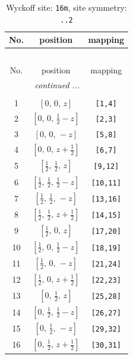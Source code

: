 \documentclass[fleqn,8pt]{jsarticle}
\begin{document}
\renewcommand{\arraystretch}{1.2}
\begin{longtable}{ccc}
\caption{Wyckoff site: {\tt 16m}, site symmetry: {\tt ..2}}
 \\
 \hline \hline
No. & position & mapping \\ \hline \endfirsthead

\multicolumn{2}{l}{\tablename\ \thetable{}} \\
 \hline \hline
No. & position & mapping \\ \hline \endhead

 \hline \hline
\multicolumn{2}{r}{\footnotesize\it continued ...} \\ \endfoot

 \hline \hline
\multicolumn{2}{r}{} \\ \endlastfoot

1 & $\left[ 0,\, 0,\, z \right]$ & {\tt [1,4]} \\ \hline
2 & $\left[ 0,\, 0,\, \frac{1}{2} - z \right]$ & {\tt [2,3]} \\ \hline
3 & $\left[ 0,\, 0,\, - z \right]$ & {\tt [5,8]} \\ \hline
4 & $\left[ 0,\, 0,\, z + \frac{1}{2} \right]$ & {\tt [6,7]} \\ \hline
5 & $\left[ \frac{1}{2},\, \frac{1}{2},\, z \right]$ & {\tt [9,12]} \\ \hline
6 & $\left[ \frac{1}{2},\, \frac{1}{2},\, \frac{1}{2} - z \right]$ & {\tt [10,11]} \\ \hline
7 & $\left[ \frac{1}{2},\, \frac{1}{2},\, - z \right]$ & {\tt [13,16]} \\ \hline
8 & $\left[ \frac{1}{2},\, \frac{1}{2},\, z + \frac{1}{2} \right]$ & {\tt [14,15]} \\ \hline
9 & $\left[ \frac{1}{2},\, 0,\, z \right]$ & {\tt [17,20]} \\ \hline
10 & $\left[ \frac{1}{2},\, 0,\, \frac{1}{2} - z \right]$ & {\tt [18,19]} \\ \hline
11 & $\left[ \frac{1}{2},\, 0,\, - z \right]$ & {\tt [21,24]} \\ \hline
12 & $\left[ \frac{1}{2},\, 0,\, z + \frac{1}{2} \right]$ & {\tt [22,23]} \\ \hline
13 & $\left[ 0,\, \frac{1}{2},\, z \right]$ & {\tt [25,28]} \\ \hline
14 & $\left[ 0,\, \frac{1}{2},\, \frac{1}{2} - z \right]$ & {\tt [26,27]} \\ \hline
15 & $\left[ 0,\, \frac{1}{2},\, - z \right]$ & {\tt [29,32]} \\ \hline
16 & $\left[ 0,\, \frac{1}{2},\, z + \frac{1}{2} \right]$ & {\tt [30,31]} \\
\end{longtable}
\end{document}
